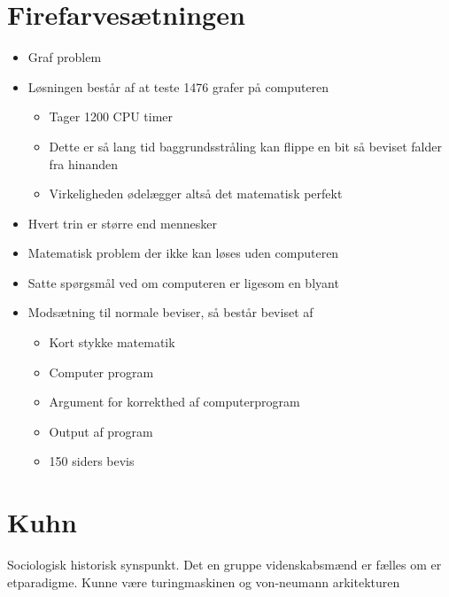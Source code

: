 \documentclass[11pt]{article}
\begin{document}
\section{Firefarvesætningen}
\label{sec:org79238c7}
\begin{itemize}
\item Graf problem
\item Løsningen består af at teste 1476 grafer på computeren
\begin{itemize}
\item Tager 1200 CPU timer
\item Dette er så lang tid baggrundsstråling kan flippe en bit så beviset falder fra hinanden
\item Virkeligheden ødelægger altså det matematisk perfekt
\end{itemize}
\item Hvert trin er større end mennesker
\item Matematisk problem der ikke kan løses uden computeren
\item Satte spørgsmål ved om computeren er ligesom en blyant
\item Modsætning til normale beviser, så består beviset af
\begin{itemize}
\item Kort stykke matematik
\item Computer program
\item Argument for korrekthed af computerprogram
\item Output af program
\item 150 siders bevis
\end{itemize}
\end{itemize}

\section{Kuhn}
\label{sec:org848a140}
Sociologisk historisk synspunkt.
Det en gruppe videnskabsmænd er fælles om er etparadigme.
Kunne være turingmaskinen og von-neumann arkitekturen
\end{document}
